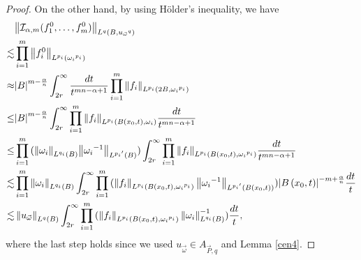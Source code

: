 \documentclass[11pt, twoside, leqno]{article}
\begin{document}
\begin{proof}[Proof]
	On the other hand, by using H\"{o}lder's inequality, we have 
	\begin{align}\label{ieq5}
	&{\left\| {{\mathcal I}_{\alpha,m}(f_1^0, \ldots ,f_m^0)} \right\|_{{L^q}(B,{u_{\vec \omega }}^q)}}\notag\\
	\lesssim & \prod\limits_{i = 1}^m {{{\left\| {f_i^0} \right\|}_{{L^{{p_i}}}({\omega _i}^{{p_i}})}}}\notag\\
	\approx& {\left| B \right|^{m - \frac{\alpha }{n}}}\int_{2r}^\infty  {\frac{{dt}}{{{t^{mn - \alpha  + 1}}}}} \prod\limits_{i = 1}^m {{{\left\| {{f_i}} \right\|}_{{L^{{p_i}}}(2B,{\omega _i}^{{p_i}})}}}\notag\\
	\le & {\left| B \right|^{m - \frac{\alpha }{n}}}\int_{2r}^\infty  {\prod\limits_{i = 1}^m {{{\left\| {{f_i}} \right\|}_{{L^{{p_i}}}(B\left( {{x_0},t} \right),{\omega _i})}}} \frac{{dt}}{{{t^{mn - \alpha  + 1}}}}}\notag\\
	\le &\prod\limits_{i = 1}^m {({{\left\| {{\omega _i}} \right\|}_{{L^{{q_i}}}(B)}}{{\left\| {{\omega _i}^{ - 1}} \right\|}_{{L^{{p_i}^\prime }}(B)}}} )\int_{2r}^\infty  {\prod\limits_{i = 1}^m {{{\left\| {{f_i}} \right\|}_{{L^{{p_i}}}(B\left( {{x_0},t} \right),{\omega _i}^{{p_i}})}}} \frac{{dt}}{{{t^{mn - \alpha  + 1}}}}}\notag\\
	\lesssim & \prod\limits_{i = 1}^m {\left\| {{\omega _i}} \right\|_{{L^{{q_i}}}(B)}^{}} \int_{2r}^\infty  {\prod\limits_{i = 1}^m {({{\left\| {{f_i}} \right\|}_{{L^{{p_i}}}(B\left( {{x_0},t} \right),{\omega _i}^{{p_i}})}}\left\| {{\omega _i}^{ - 1}} \right\|_{{L^{{p_i}^\prime }}(B\left( {{x_0},t} \right))}^{})} {{\left| {B\left( {{x_0},t} \right)} \right|}^{ - m + \frac{\alpha }{n}}}\frac{{dt}}{t}}\notag\\
	\lesssim &\left\| {{u_{\vec \omega }}} \right\|_{{L^q}(B)}^{}\int_{2r}^\infty  {\prod\limits_{i = 1}^m {({{\left\| {{f_i}} \right\|}_{{L^{{p_i}}}(B\left( {{x_0},t} \right),{\omega _i}^{{p_i}})}}\left\| {{\omega _i}} \right\|_{{L^{{q_i}}}(B)}^{ - 1})} \frac{{dt}}{t}},
	\end{align}
	where  the last step holds since we used ${u_{\vec \omega }} \in {A_{\vec P,q}}$ and Lemma \ref{cen4}.
	

\end{proof}
\end{document}

